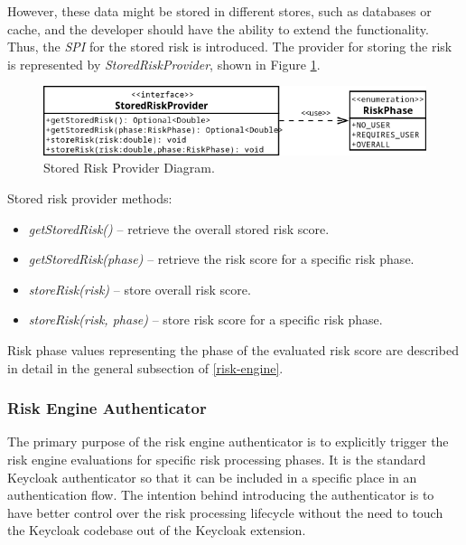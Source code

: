 However, these data might be stored in different stores, such as databases or cache, and the developer should have the ability to extend the functionality.
Thus, the \textit{SPI} for the stored risk is introduced.
The provider for storing the risk is represented by \textit{StoredRiskProvider}, shown in Figure \ref{fig:design-stored-risk-diagram}.

\begin{figure}[htbp]
  \centering
  \includegraphics[width=1\textwidth]{img/sections/5-design/stored-risk-provider.png}
  \caption{Stored Risk Provider Diagram.}
  \label{fig:design-stored-risk-diagram}
\end{figure}

\newpage

Stored risk provider methods:
\begin{itemize}
    \item \textit{getStoredRisk()} -- retrieve the overall stored risk score.
    \item \textit{getStoredRisk(phase)} -- retrieve the risk score for a specific risk phase.
    \item \textit{storeRisk(risk)} -- store overall risk score.
    \item \textit{storeRisk(risk, phase)} -- store risk score for a specific risk phase.
\end{itemize}

Risk phase values representing the phase of the evaluated risk score are described in detail in the general subsection of \ref{risk-engine}.

\subsubsection{Risk Engine Authenticator}
The primary purpose of the risk engine authenticator is to explicitly trigger the risk engine evaluations for specific risk processing phases.
It is the standard Keycloak authenticator so that it can be included in a specific place in an authentication flow.
The intention behind introducing the authenticator is to have better control over the risk processing lifecycle without the need to touch the Keycloak codebase out of the Keycloak extension.

